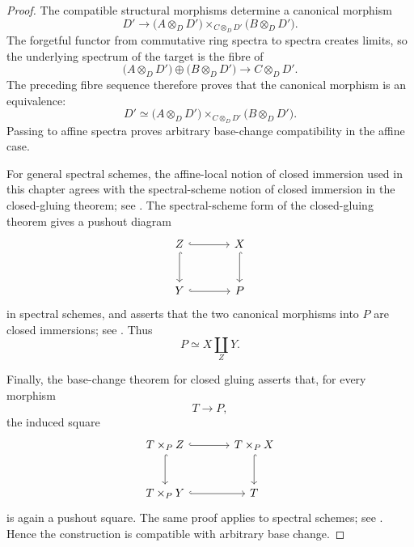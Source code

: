 \begin{proof}
The compatible structural morphisms determine a canonical morphism
\[
    D'
    \longrightarrow
    \bigl(
        A\otimes_DD'
    \bigr)
    \times_{C\otimes_DD'}
    \bigl(
        B\otimes_DD'
    \bigr).
\]
The forgetful functor from commutative ring spectra to spectra creates
limits, so the underlying spectrum of the target is the fibre of
\[
    \bigl(
        A\otimes_DD'
    \bigr)
    \oplus
    \bigl(
        B\otimes_DD'
    \bigr)
    \longrightarrow
    C\otimes_DD'.
\]
The preceding fibre sequence therefore proves that the canonical
morphism is an equivalence:
\[
    D'
    \simeq
    \bigl(
        A\otimes_DD'
    \bigr)
    \times_{C\otimes_DD'}
    \bigl(
        B\otimes_DD'
    \bigr).
\]
Passing to affine spectra proves arbitrary base-change compatibility in
the affine case.

For general spectral schemes, the affine-local notion of closed
immersion used in this chapter agrees with the spectral-scheme notion of
closed immersion in the closed-gluing theorem; see
\cite[Theorem~4.4 and Remark~4.5]{LurieDAGIX}.
The spectral-scheme form of the closed-gluing theorem gives a pushout
diagram
\[
\begin{tikzcd}[column sep=large, row sep=large]
    Z
        \arrow[r, hook]
        \arrow[d, hook]
    &
    X
        \arrow[d, hook]
    \\
    Y
        \arrow[r, hook]
    &
    P
\end{tikzcd}
\]
in spectral schemes, and asserts that the two canonical morphisms into
$P$ are closed immersions; see
\cite[Theorem~6.1 and Remark~6.2]{LurieDAGIX}.
Thus
\[
    P
    \simeq
    X\coprod_ZY.
\]

Finally, the base-change theorem for closed gluing asserts that, for
every morphism
\[
    T
    \longrightarrow
    P,
\]
the induced square
\[
\begin{tikzcd}[column sep=large, row sep=large]
    T\times_PZ
        \arrow[r, hook]
        \arrow[d, hook]
    &
    T\times_PX
        \arrow[d, hook]
    \\
    T\times_PY
        \arrow[r, hook]
    &
    T
\end{tikzcd}
\]
is again a pushout square. The same proof applies to spectral schemes;
see \cite[Proposition~9.2]{LurieDAGIX}. Hence the construction is
compatible with arbitrary base change.
\end{proof}

